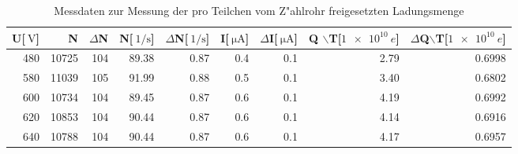 
\begin{table}[!h]
\begin{center}
\begin{tabular}{|r|r|r|r|r|r|r|r|r|}
\hline
U[$\SI{}{\volt}$] & N & $\Delta$N & N[$\SI{}{1\per\second}$] & $\Delta$N[$\SI{}{1\per\second}$] & I[$\SI{}{\micro\ampere}$] & $\Delta$I[$\SI{}{\micro\ampere}$] & Q $\backslash$T[$\SI{1 e10}{e}$] & $\Delta$Q$\backslash$T[$\SI{1 e10}{e}$] \\
\hline
\hline
480	 &   10725 & 104 & 89.38  & 0.87 &	0.4	& 0.1 & 2.79 & 0.6998\\
580	 &   11039 & 105 & 91.99  & 0.88 &	0.5	& 0.1 & 3.40 & 0.6802\\
600	 &   10734 & 104 & 89.45  & 0.87 &	0.6	& 0.1 & 4.19 & 0.6992\\
620	 &   10853 & 104 & 90.44  & 0.87 &	0.6	& 0.1 & 4.14 & 0.6916\\
640	 &   10788 & 104 & 90.44  & 0.87 &	0.6	& 0.1 & 4.17 & 0.6957\\
\hline
\end{tabular}
\caption[Aufgabe e]{Messdaten zur Messung der pro Teilchen vom Z"ahlrohr freigesetzten Ladungsmenge}
\label{tabellee}
\end{center}
\end{table}